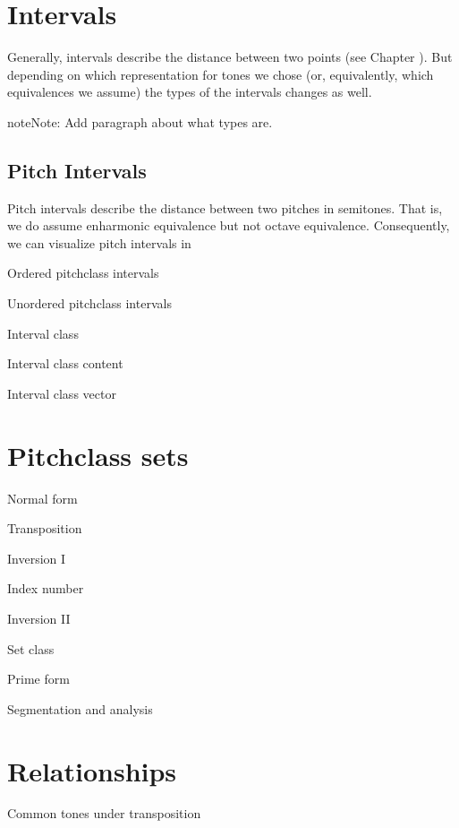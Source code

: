 \documentclass[letterpaper,10pt,english]{sphinxmanual}
\begin{document}
\section{Intervals}
\label{\detokenize{3_set_theory:intervals}}
Generally, intervals describe the distance between two points (see Chapter {\hyperref[\detokenize{1_fundamentals:intervals}]{}}).
But depending on which representation for tones we chose (or, equivalently, which equivalences we assume)
the types of the intervals changes as well.

\begin{sphinxadmonition}{note}{Note:}
Add paragraph about what types are.
\end{sphinxadmonition}


\subsection{Pitch Intervals}
\label{\detokenize{3_set_theory:pitch-intervals}}
Pitch intervals describe the distance between two pitches in semitones. That is, we do assume enharmonic equivalence
but not octave equivalence. Consequently, we can visualize pitch intervals in

Ordered pitch\sphinxhyphen{}class intervals

Unordered pitch\sphinxhyphen{}class intervals

Interval class

Interval class content

Interval class vector


\section{Pitch\sphinxhyphen{}class sets}
\label{\detokenize{3_set_theory:pitch-class-sets}}
Normal form

Transposition

Inversion I

Index number

Inversion II

Set class

Prime form

Segmentation and analysis


\section{Relationships}
\label{\detokenize{3_set_theory:relationships}}
Common tones under transposition
\end{document}
